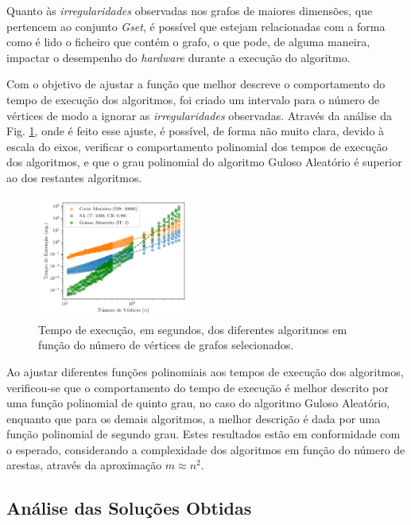 \documentclass[mirror, portugues]{revdetua}
\begin{document}
Quanto às \textit{irregularidades} observadas nos grafos de maiores dimensões, que pertencem ao conjunto \textit{Gset}, é possível que estejam relacionadas com a forma como é lido o ficheiro que contém o grafo, o que pode, de alguma maneira, impactar o desempenho do \textit{hardware} durante a execução do algoritmo.


Com o objetivo de ajustar a função que melhor descreve o comportamento do tempo de execução dos algoritmos, foi criado um intervalo para o número de vértices de modo a ignorar as \textit{irregularidades} observadas. Através da análise da Fig. \ref{fig:time_interval}, onde é feito esse ajuste, é possível, de forma não muito clara, devido à escala do eixos, verificar o comportamento polinomial dos tempos de execução dos algoritmos, e que o grau polinomial do algoritmo Guloso Aleatório é superior ao dos restantes algoritmos.

\begin{figure}[H]
    \centering
    \includegraphics[width=0.45\textwidth]{../assets/time_interval.png}
    \caption{Tempo de execução, em segundos, dos diferentes algoritmos em função do número de vértices de grafos selecionados.}
    \label{fig:time_interval}
\end{figure}

Ao ajustar diferentes funções polinomiais aos tempos de execução dos algoritmos, verificou-se que o comportamento do tempo de execução é melhor descrito por uma função polinomial de quinto grau, no caso do algoritmo Guloso Aleatório, enquanto que para os demais algoritmos, a melhor descrição é dada por uma função polinomial de segundo grau. Estes resultados estão em conformidade com o esperado, considerando a complexidade dos algoritmos em função do número de arestas, através da aproximação $m \approx n^2$.


\subsection{Análise das Soluções Obtidas}
\end{document}

